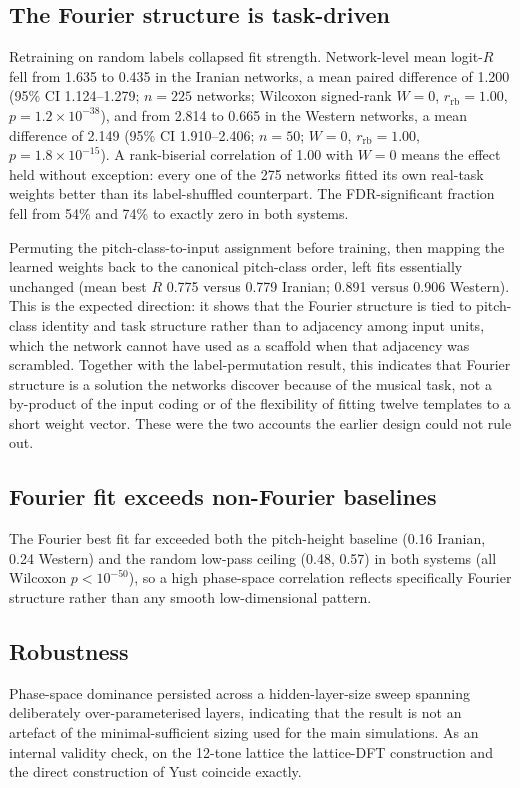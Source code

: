 \documentclass[pdflatex,sn-nature]{sn-jnl}
\newcommand{\num}[1]{#1}
\begin{document}
\subsection{The Fourier structure is task-driven}
Retraining on random labels collapsed fit strength. Network-level mean logit-$R$ fell from
\num{1.635} to \num{0.435} in the Iranian networks, a mean paired difference of
\num{1.200} (95\% CI \num{1.124}--\num{1.279}; $n = \num{225}$ networks; Wilcoxon
signed-rank $W = \num{0}$, $r_{\mathrm{rb}} = \num{1.00}$,
$p = \num{1.2\times10^{-38}}$), and from \num{2.814} to \num{0.665} in the Western
networks, a mean difference of \num{2.149} (95\% CI \num{1.910}--\num{2.406};
$n = \num{50}$; $W = \num{0}$, $r_{\mathrm{rb}} = \num{1.00}$,
$p = \num{1.8\times10^{-15}}$). A rank-biserial correlation of \num{1.00} with $W = 0$
means the effect held without exception: every one of the \num{275} networks fitted its
own real-task weights better than its label-shuffled counterpart. The FDR-significant
fraction fell from \num{54}\% and \num{74}\% to exactly zero in both systems.

Permuting the pitch-class-to-input assignment before training, then mapping the learned
weights back to the canonical pitch-class order, left fits essentially unchanged
(mean best $R$ \num{0.775} versus \num{0.779} Iranian; \num{0.891} versus \num{0.906}
Western). This is the expected direction: it shows that the Fourier structure is tied to
pitch-class identity and task structure rather than to adjacency among input units, which
the network cannot have used as a scaffold when that adjacency was scrambled. Together with
the label-permutation result, this indicates that Fourier structure is a solution the
networks discover because of the musical task, not a by-product of the input coding or of
the flexibility of fitting twelve templates to a short weight vector. These were the two
accounts the earlier design could not rule out.

\subsection{Fourier fit exceeds non-Fourier baselines}
The Fourier best fit far exceeded both the pitch-height baseline (\num{0.16} Iranian,
\num{0.24} Western) and the random low-pass ceiling (\num{0.48}, \num{0.57}) in both systems
(all Wilcoxon $p < 10^{-50}$), so a high phase-space correlation reflects specifically
Fourier structure rather than any smooth low-dimensional pattern.

\subsection{Robustness}
Phase-space dominance persisted across a hidden-layer-size sweep spanning deliberately
over-parameterised layers, indicating that the result is not an artefact of the
minimal-sufficient sizing used for the main simulations. As an internal validity check, on
the 12-tone lattice the lattice-DFT construction and the direct construction of Yust \cite{yust2016} coincide exactly.
\end{document}
